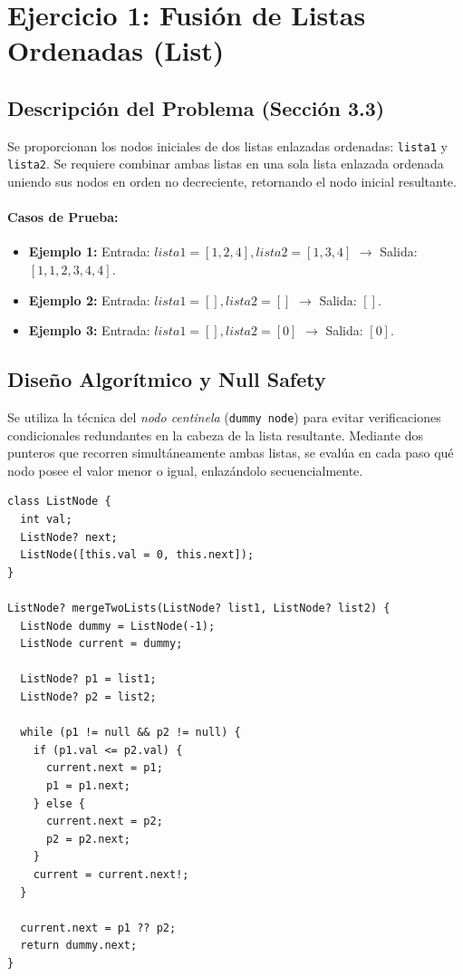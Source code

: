 \documentclass[12pt,a4paper]{article}
\begin{document}
\section{Ejercicio 1: Fusión de Listas Ordenadas (List)}

\subsection{Descripción del Problema (Sección 3.3)}
Se proporcionan los nodos iniciales de dos listas enlazadas ordenadas: \texttt{lista1} y \texttt{lista2}. Se requiere combinar ambas listas en una sola lista enlazada ordenada uniendo sus nodos en orden no decreciente, retornando el nodo inicial resultante.

\paragraph{Casos de Prueba:}
\begin{itemize}
    \item \textbf{Ejemplo 1:} Entrada: $lista1 = [1,2,4], lista2 = [1,3,4]$ $\rightarrow$ Salida: $[1,1,2,3,4,4]$.
    \item \textbf{Ejemplo 2:} Entrada: $lista1 = [], lista2 = []$ $\rightarrow$ Salida: $[]$.
    \item \textbf{Ejemplo 3:} Entrada: $lista1 = [], lista2 = [0]$ $\rightarrow$ Salida: $[0]$.
\end{itemize}

\subsection{Diseño Algorítmico y Null Safety}
Se utiliza la técnica del \textit{nodo centinela} (\texttt{dummy node}) para evitar verificaciones condicionales redundantes en la cabeza de la lista resultante. Mediante dos punteros que recorren simultáneamente ambas listas, se evalúa en cada paso qué nodo posee el valor menor o igual, enlazándolo secuencialmente.

\begin{lstlisting}[caption={Solución al Ejercicio 1 con ListNode y List en Dart}]
class ListNode {
  int val;
  ListNode? next;
  ListNode([this.val = 0, this.next]);
}

ListNode? mergeTwoLists(ListNode? list1, ListNode? list2) {
  ListNode dummy = ListNode(-1);
  ListNode current = dummy;

  ListNode? p1 = list1;
  ListNode? p2 = list2;

  while (p1 != null && p2 != null) {
    if (p1.val <= p2.val) {
      current.next = p1;
      p1 = p1.next;
    } else {
      current.next = p2;
      p2 = p2.next;
    }
    current = current.next!;
  }

  current.next = p1 ?? p2;
  return dummy.next;
}
\end{lstlisting}
\end{document}
